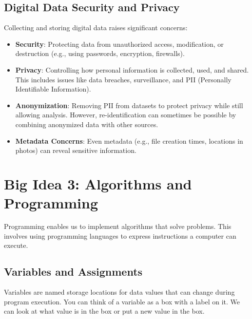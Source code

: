 \documentclass[11pt,oneside]{book}
\begin{document}
\section{Digital Data Security and Privacy}
\label{sec:data_security_privacy}
Collecting and storing digital data raises significant concerns:
\begin{itemize}
    \item \textbf{Security}: Protecting data from unauthorized access, modification, or destruction (e.g., using passwords, encryption, firewalls).
    \item \textbf{Privacy}: Controlling how personal information is collected, used, and shared. This includes issues like data breaches, surveillance, and PII (Personally Identifiable Information).
    \item \textbf{Anonymization}: Removing PII from datasets to protect privacy while still allowing analysis. However, re-identification can sometimes be possible by combining anonymized data with other sources.
    \item \textbf{Metadata Concerns}: Even metadata (e.g., file creation times, locations in photos) can reveal sensitive information.
\end{itemize}

\chapter{Big Idea 3: Algorithms and Programming}
\label{chap:algorithms_programming}
Programming enables us to implement algorithms that solve problems. This involves using programming languages to express instructions a computer can execute.

\section{Variables and Assignments}
\label{sec:variables_assignment}
Variables are named storage locations for data values that can change during program execution. You can think of a variable as a box with a label on it. We can look at what value is in the box or put a new value in the box.
\end{document}
